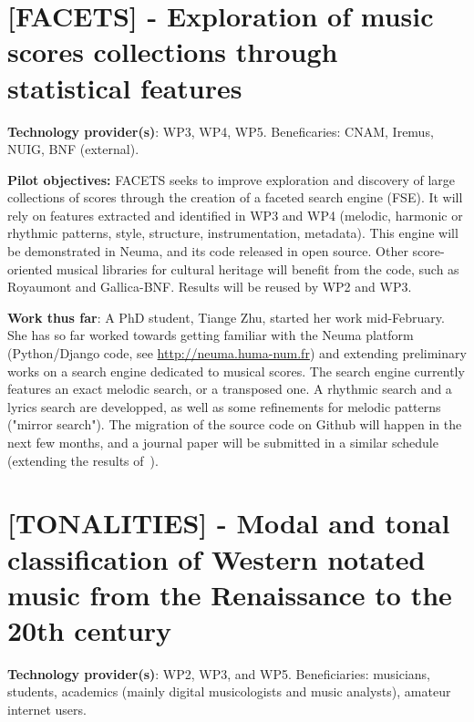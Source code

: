 \section{[FACETS] - Exploration of music scores collections through statistical features}\label{sec:pilot:facets}

\textbf{Technology provider(s)}: WP3, WP4, WP5.
Beneficaries: CNAM, Iremus, NUIG, BNF (external).

\textbf{Pilot objectives:} FACETS seeks to improve exploration and discovery of large collections of scores through the creation of a faceted search engine (FSE). It will rely on features extracted and identified in WP3 and WP4 (melodic, harmonic or rhythmic patterns, style, structure, instrumentation, metadata). This engine will be demonstrated in Neuma, and its code released in open source. Other score-oriented musical libraries for cultural heritage will benefit from the code, such as Royaumont and Gallica-BNF. Results will be reused by WP2 and WP3.

\textbf{Work thus far}: A PhD student, Tiange Zhu, started her work mid-February. She has so far worked towards getting familiar with the Neuma platform (Python/Django code, see \url{http://neuma.huma-num.fr}) and extending preliminary works on a search engine dedicated to musical scores. The search engine currently features an exact melodic search, or a transposed one. A rhythmic search and a lyrics search are developped, as well as some refinements for melodic patterns ("mirror search"). The migration of the source code on Github will happen in the next few months, and a journal paper will be submitted in a similar schedule (extending the results of~\cite{rigaux2019scalable}).



\section{[TONALITIES] - Modal and tonal classification of Western notated music from the Renaissance to the 20th century}\label{sec:pilot:tonalities}
\textbf{Technology provider(s)}: WP2, WP3, and WP5. Beneficiaries: musicians, students, academics (mainly digital musicologists and music analysts), amateur internet users.

